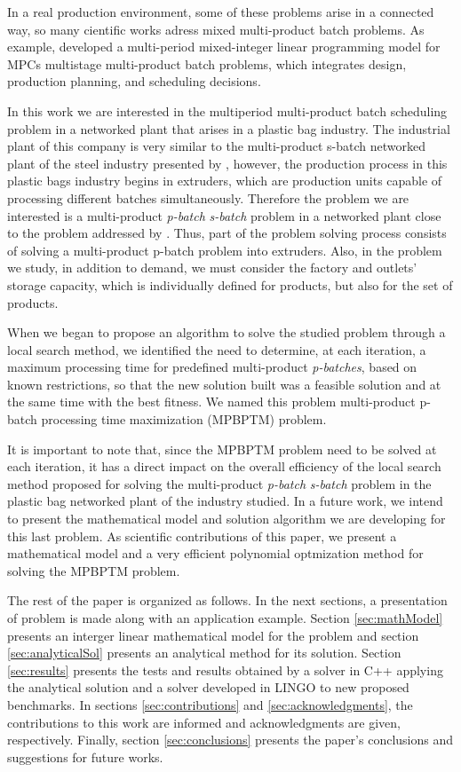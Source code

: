 \documentclass[authoryear,manuscript,12pt]{elsarticle}
\begin{document}
In a real production environment, some of these problems arise in a connected way, so many cientific works adress mixed multi-product batch problems. As example, \cite{FumeroEtAl2016} developed a multi-period mixed-integer linear programming model for MPCs multistage multi-product batch problems, which integrates design, production planning, and scheduling decisions. 

In this work we are interested in the multiperiod multi-product batch scheduling problem in a networked plant that arises in a plastic bag industry. The industrial plant of this company is very similar to the multi-product s-batch networked plant of the steel industry presented by \cite{LiuEtAl2020}, however, the production process in this plastic bags industry begins in extruders, which are production units capable of processing different batches simultaneously. Therefore the problem we are interested is a multi-product \emph{p-batch} \emph{s-batch} problem in a networked plant close to the problem addressed by \cite{LiEtAl2022}. Thus, part of the problem solving process consists of solving a multi-product p-batch problem into extruders. Also, in the problem we study, in addition to demand, we must consider the factory and outlets' storage capacity, which is individually defined for products, but also for the set of products. 

When we began to propose an algorithm to solve the studied problem through a local search method, we identified the need to determine, at each iteration, a maximum processing time for predefined multi-product \emph{p-batches}, based on known restrictions, so that the new solution built was a feasible solution and at the same time with the best fitness. We named this problem multi-product p-batch processing time maximization (MPBPTM) problem. 

It is important to note that, since the MPBPTM problem need to be solved at each iteration, it has a direct impact on the overall efficiency of the local search method proposed for solving the multi-product \emph{p-batch} \emph{s-batch} problem in the plastic bag networked plant of the industry studied. In a future work, we intend to present the mathematical model and solution algorithm we are developing for this last problem. As scientific contributions of this paper, we present a mathematical model and a very efficient polynomial optmization method for solving the MPBPTM problem.

The rest of the paper is organized as follows. In the next sections, a presentation of problem is made along with an application example. Section \ref{sec:mathModel} presents an interger linear mathematical model for the problem and section \ref{sec:analyticalSol} presents an analytical method for its solution. Section \ref{sec:results} presents the tests and results obtained by a solver in C++ applying the analytical solution and a solver developed in LINGO to new proposed benchmarks. In sections \ref{sec:contributions} and \ref{sec:acknowledgments}, the contributions to this work are informed and acknowledgments are given, respectively. Finally, section \ref{sec:conclusions} presents the paper's conclusions and suggestions for future works.
\end{document}
